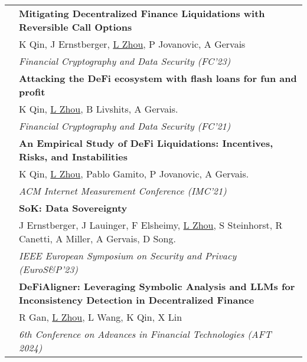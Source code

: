 \documentclass[letterpaper, 8pt]{article}
\newcommand{\corerankingA}{\corebox{red}{15}{\xspace A \xspace}\xspace}
\newcommand{\tagSecurity}{\corebox{blue}{10}{Security}\xspace}
\newcommand{\tagML}{\corebox{yellow}{20}{Machine Learning}\xspace}
\newcommand{\tagSA}{\corebox{brown}{20}{System Analysis}\xspace}
\begin{document}
\begin{longtable}{p{0.5in}p{5.5in}}
& \textbf{Mitigating Decentralized Finance Liquidations with Reversible Call Options} \\
& {\footnotesize K Qin, J Ernstberger, \underline{L Zhou}, P Jovanovic, A Gervais} \\
& {\footnotesize \corerankingA \textit{Financial Cryptography and Data Security (FC'23)}}\\
& \textbf{Attacking the DeFi ecosystem with flash loans for fun and profit} \tagSecurity \tagSA \\
& {\footnotesize K Qin, \underline{L Zhou}, B Livshits, A Gervais.} \\
& {\footnotesize \corerankingA \textit{Financial Cryptography and Data Security (FC'21)}}\\
& \textbf{An Empirical Study of DeFi Liquidations: Incentives, Risks, and Instabilities} \\
& {\footnotesize K Qin, \underline{L Zhou}, Pablo Gamito, P Jovanovic, A Gervais.} \\
& {\footnotesize \corerankingA \textit{ACM Internet Measurement Conference (IMC'21)}}\\
& \textbf{SoK: Data Sovereignty} \\
& {\footnotesize J Ernstberger, J Lauinger, F Elsheimy, \underline{L Zhou}, S Steinhorst, R Canetti, A Miller, A Gervais, D Song.} \\
& {\footnotesize \textit{IEEE European Symposium on Security and Privacy (EuroS\&P'23)}} \\
& \textbf{DeFiAligner: Leveraging Symbolic Analysis and LLMs for Inconsistency Detection in Decentralized Finance} \\
& {\footnotesize R Gan, \underline{L Zhou}, L Wang, K Qin, X Lin} \tagSecurity \tagML \\
& {\footnotesize \textit{6th Conference on Advances in Financial Technologies (AFT 2024)}}\\


\end{longtable}
\end{document}
